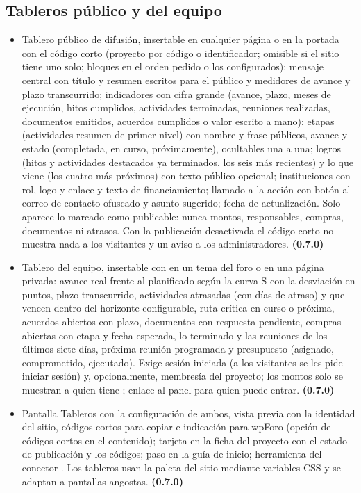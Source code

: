 \documentclass[11pt,a4paper]{article}
\begin{document}
\subsection{Tableros público y del equipo}
\label{sec:tableros}
\begin{itemize}
\item Tablero público de difusión, insertable en cualquier página o en la portada con el código corto \codigo{[gdp_avance proyecto="CODIGO" bloques="..."]} (proyecto por código o identificador; omisible si el sitio tiene uno solo; bloques en el orden pedido o los configurados): mensaje central con título y resumen escritos para el público y medidores de avance y plazo transcurrido; indicadores con cifra grande (avance, plazo, meses de ejecución, hitos cumplidos, actividades terminadas, reuniones realizadas, documentos emitidos, acuerdos cumplidos o valor escrito a mano); etapas (actividades resumen de primer nivel) con nombre y frase públicos, avance y estado (completada, en curso, próximamente), ocultables una a una; logros (hitos y actividades destacados ya terminados, los seis más recientes) y lo que viene (los cuatro más próximos) con texto público opcional; instituciones con rol, logo y enlace y texto de financiamiento; llamado a la acción con botón  al correo de contacto ofuscado y asunto sugerido; fecha de actualización. Solo aparece lo marcado como publicable: nunca montos, responsables, compras, documentos ni atrasos. Con la publicación desactivada el código corto no muestra nada a los visitantes y un aviso a los administradores. \textbf{(0.7.0)}
\item Tablero del equipo, insertable con \codigo{[gdp_tablero_equipo proyecto="CODIGO"]} en un tema del foro o en una página privada: avance real frente al planificado según la curva S con la desviación en puntos, plazo transcurrido, actividades atrasadas (con días de atraso) y que vencen dentro del horizonte configurable, ruta crítica en curso o próxima, acuerdos abiertos con plazo, documentos con respuesta pendiente, compras abiertas con etapa y fecha esperada, lo terminado y las reuniones de los últimos siete días, próxima reunión programada y presupuesto (asignado, comprometido, ejecutado). Exige sesión iniciada (a los visitantes se les pide iniciar sesión) y, opcionalmente, membresía del proyecto; los montos solo se muestran a quien tiene ; enlace al panel para quien puede entrar. \textbf{(0.7.0)}
\item Pantalla Tableros con la configuración de ambos, vista previa con la identidad del sitio, códigos cortos para copiar e indicación para wpForo (opción de códigos cortos en el contenido); tarjeta en la ficha del proyecto con el estado de publicación y los códigos; paso en la guía de inicio; herramienta del conector . Los tableros usan la paleta del sitio mediante variables CSS y se adaptan a pantallas angostas. \textbf{(0.7.0)}

\end{itemize}
\end{document}

